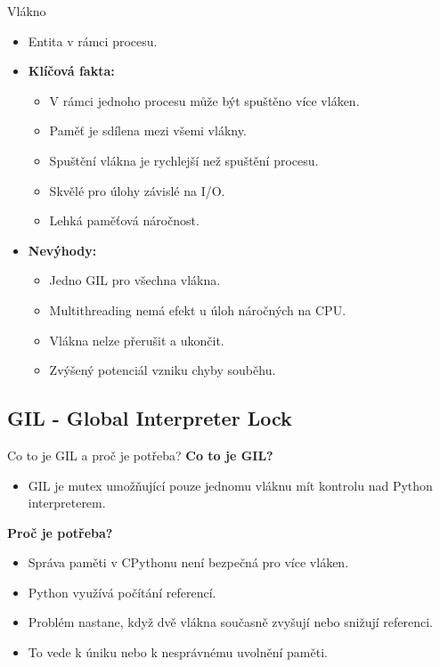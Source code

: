 \documentclass{beamer}
\begin{document}
\begin{frame}{Vlákno}
	\begin{itemize}
		\item Entita v rámci procesu.
		\item \textbf{Klíčová fakta:}
			\begin{itemize}
				\item [\textendash] V rámci jednoho procesu může být spuštěno více vláken.
				\item [\textendash] Paměť je sdílena mezi všemi vlákny.
				\item [\textendash] Spuštění vlákna je rychlejší než spuštění procesu.
				\item [\textendash] Skvělé pro úlohy závislé na I/O.
				\item [\textendash] Lehká paměťová náročnost.
			\end{itemize}
		\item \textbf{Nevýhody:}
			\begin{itemize}
				\item [\textendash] Jedno GIL pro všechna vlákna.
				\item [\textendash] Multithreading nemá efekt u úloh náročných na CPU.
				\item [\textendash] Vlákna nelze přerušit a ukončit.
				\item [\textendash] Zvýšený potenciál vzniku chyby souběhu.
			\end{itemize}
	\end{itemize}
\end{frame}

\subsection{GIL - Global Interpreter Lock}
\begin{frame}{Co to je GIL a proč je potřeba?}
	\textbf{Co to je GIL?}
	\begin{itemize}
		\item GIL je mutex umožňující pouze jednomu vláknu mít kontrolu nad Python interpreterem.
	\end{itemize}
	\textbf{Proč je potřeba?}
	\begin{itemize}
		\item Správa paměti v CPythonu není bezpečná pro více vláken.
		\item Python využívá počítání referencí.
		\item Problém nastane, když dvě vlákna současně zvyšují nebo snižují referenci.
		\item To vede k úniku nebo k nesprávnému uvolnění paměti.
	\end{itemize}
\end{frame}
\end{document}
